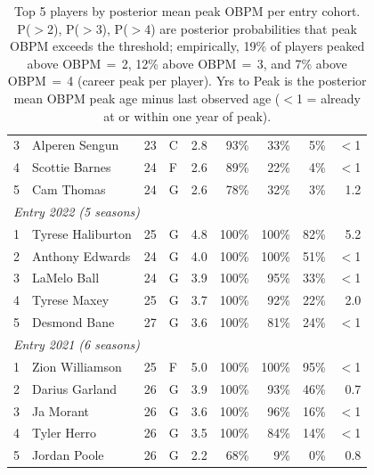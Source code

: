 \begin{table}[htbp]
\begin{tabular}{rlrlrrrrr}
    3 & Alperen Sengun & 23 & C & 2.8 & 93\% & 33\% & 5\% & $<$1 \\
    4 & Scottie Barnes & 24 & F & 2.6 & 89\% & 22\% & 4\% & $<$1 \\
    5 & Cam Thomas & 24 & G & 2.6 & 78\% & 32\% & 3\% & 1.2 \\
    \midrule[0.4pt]
    \multicolumn{9}{l}{\textit{Entry 2022 (5 seasons)}} \\
    \midrule
    1 & Tyrese Haliburton & 25 & G & 4.8 & 100\% & 100\% & 82\% & 5.2 \\
    2 & Anthony Edwards & 24 & G & 4.0 & 100\% & 100\% & 51\% & $<$1 \\
    3 & LaMelo Ball & 24 & G & 3.9 & 100\% & 95\% & 33\% & $<$1 \\
    4 & Tyrese Maxey & 25 & G & 3.7 & 100\% & 92\% & 22\% & 2.0 \\
    5 & Desmond Bane & 27 & G & 3.6 & 100\% & 81\% & 24\% & $<$1 \\
    \midrule[0.4pt]
    \multicolumn{9}{l}{\textit{Entry 2021 (6 seasons)}} \\
    \midrule
    1 & Zion Williamson & 25 & F & 5.0 & 100\% & 100\% & 95\% & $<$1 \\
    2 & Darius Garland & 26 & G & 3.9 & 100\% & 93\% & 46\% & 0.7 \\
    3 & Ja Morant & 26 & G & 3.6 & 100\% & 96\% & 16\% & $<$1 \\
    4 & Tyler Herro & 26 & G & 3.5 & 100\% & 84\% & 14\% & $<$1 \\
    5 & Jordan Poole & 26 & G & 2.2 & 68\% & 9\% & 0\% & 0.8 \\
    \bottomrule
  \end{tabular}
  \caption{Top 5 players by posterior mean peak OBPM per entry cohort. P($>$2), P($>$3), P($>$4) are posterior probabilities that peak OBPM exceeds the threshold; empirically, 19\% of players peaked above OBPM\,$=$\,2, 12\% above OBPM\,$=$\,3, and 7\% above OBPM\,$=$\,4 (career peak per player). Yrs to Peak is the posterior mean OBPM peak age minus last observed age ($<$1 = already at or within one year of peak).}
  \label{tab:breakout_cohort}
\end{table}


